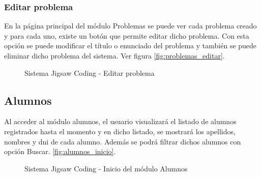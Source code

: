 \subsubsection{Editar problema}
En la página principal del módulo Problemas se puede ver cada problema creado y para cada uno, existe un botón que permite editar dicho problema. Con esta opción se puede modificar el título o enunciado del problema y también se puede eliminar dicho problema del sistema. Ver figura \autoref{fig:problemas_editar}.

\begin{figure}
\centering
\caption[SJC Editar problema]{Sistema Jigsaw Coding - Editar problema}
\label{fig:problemas_editar}
\end{figure}

\subsection{Alumnos}
Al acceder al módulo alumnos, el usuario visualizará el listado de alumnos registrados hasta el momento y en dicho listado, se mostrará los apellidos, nombres y dni de cada alumno. Además se podrá filtrar dichos alumnos con opción Buscar. \autoref{fig:alumnos_inicio}.

\begin{figure}
	\centering
	\caption[SJC Alumnos]{Sistema Jigsaw Coding - Inicio del módulo Alumnos}
	\label{fig:alumnos_inicio}
\end{figure}

